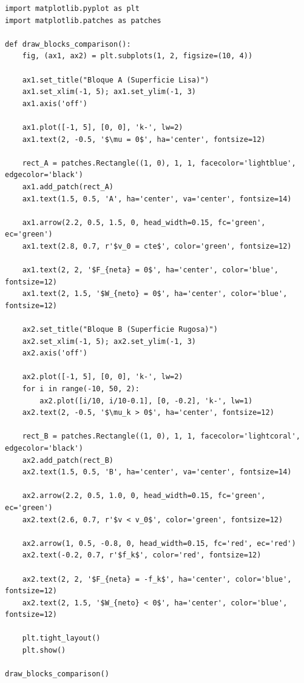 \documentclass[12pt, a4paper]{article}
\begin{document}
\begin{lstlisting}
import matplotlib.pyplot as plt
import matplotlib.patches as patches

def draw_blocks_comparison():
    fig, (ax1, ax2) = plt.subplots(1, 2, figsize=(10, 4))
    
    ax1.set_title("Bloque A (Superficie Lisa)")
    ax1.set_xlim(-1, 5); ax1.set_ylim(-1, 3)
    ax1.axis('off')
    
    ax1.plot([-1, 5], [0, 0], 'k-', lw=2)
    ax1.text(2, -0.5, '$\mu = 0$', ha='center', fontsize=12)
    
    rect_A = patches.Rectangle((1, 0), 1, 1, facecolor='lightblue', edgecolor='black')
    ax1.add_patch(rect_A)
    ax1.text(1.5, 0.5, 'A', ha='center', va='center', fontsize=14)
    
    ax1.arrow(2.2, 0.5, 1.5, 0, head_width=0.15, fc='green', ec='green')
    ax1.text(2.8, 0.7, r'$v_0 = cte$', color='green', fontsize=12)
    
    ax1.text(2, 2, '$F_{neta} = 0$', ha='center', color='blue', fontsize=12)
    ax1.text(2, 1.5, '$W_{neto} = 0$', ha='center', color='blue', fontsize=12)

    ax2.set_title("Bloque B (Superficie Rugosa)")
    ax2.set_xlim(-1, 5); ax2.set_ylim(-1, 3)
    ax2.axis('off')
    
    ax2.plot([-1, 5], [0, 0], 'k-', lw=2)
    for i in range(-10, 50, 2):
        ax2.plot([i/10, i/10-0.1], [0, -0.2], 'k-', lw=1)
    ax2.text(2, -0.5, '$\mu_k > 0$', ha='center', fontsize=12)
    
    rect_B = patches.Rectangle((1, 0), 1, 1, facecolor='lightcoral', edgecolor='black')
    ax2.add_patch(rect_B)
    ax2.text(1.5, 0.5, 'B', ha='center', va='center', fontsize=14)
    
    ax2.arrow(2.2, 0.5, 1.0, 0, head_width=0.15, fc='green', ec='green')
    ax2.text(2.6, 0.7, r'$v < v_0$', color='green', fontsize=12)
    
    ax2.arrow(1, 0.5, -0.8, 0, head_width=0.15, fc='red', ec='red')
    ax2.text(-0.2, 0.7, r'$f_k$', color='red', fontsize=12)
    
    ax2.text(2, 2, '$F_{neta} = -f_k$', ha='center', color='blue', fontsize=12)
    ax2.text(2, 1.5, '$W_{neto} < 0$', ha='center', color='blue', fontsize=12)

    plt.tight_layout()
    plt.show()

draw_blocks_comparison()
\end{lstlisting}
\end{document}
